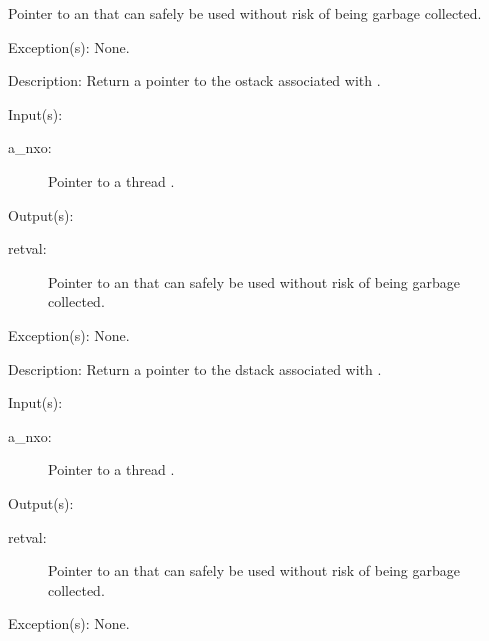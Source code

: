 \begin{capi}
\begin{capilist}
\begin{description}
			Pointer to an  that can safely be used
			without risk of being garbage collected.
		\end{description}
	\item[Exception(s): ] None.
	\item[Description: ]
		Return a pointer to the ostack associated with .
	\end{capilist}
\label{nxo_thread_dstack_get}
	\begin{capilist}
	\item[Input(s): ]
		\begin{description}\item[]
		\item[a\_nxo: ]
			Pointer to a thread .
		\end{description}
	\item[Output(s): ]
		\begin{description}\item[]
		\item[retval: ]
			Pointer to an  that can safely be used
			without risk of being garbage collected.
		\end{description}
	\item[Exception(s): ] None.
	\item[Description: ]
		Return a pointer to the dstack associated with .
	\end{capilist}
\label{nxo_thread_estack_get}
	\begin{capilist}
	\item[Input(s): ]
		\begin{description}\item[]
		\item[a\_nxo: ]
			Pointer to a thread \classname{nxo}.
		\end{description}
	\item[Output(s): ]
		\begin{description}\item[]
		\item[retval: ]
			Pointer to an  that can safely be used
			without risk of being garbage collected.
		\end{description}
	\item[Exception(s): ] None.

\end{capilist}
\end{capi}
